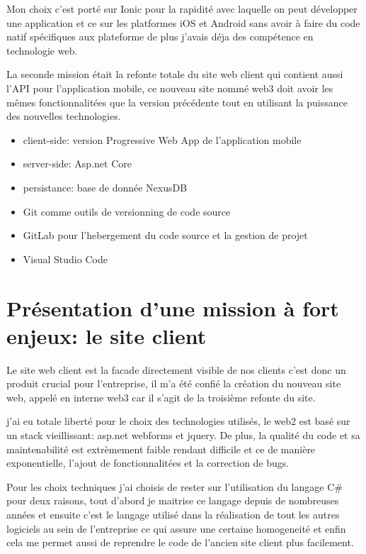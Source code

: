 Mon choix c'est porté sur Ionic pour la rapidité avec laquelle on peut développer une application 
et ce sur les platformes iOS et Android sans avoir à faire du code natif spécifiques 
aux plateforme de plus j'avais déja des compétence en technologie web.

La seconde mission était la refonte totale du site web client qui contient aussi l'API pour 
l'application mobile, ce nouveau site nommé web3 doit avoir les mêmes fonctionnalitées que 
la version précédente tout en utilisant la puissance des nouvelles technologies. \newline

\begin{itemize}
    \item client-side: version Progressive Web App de l'application mobile 
    \item server-side: Asp.net Core 
    \item persistance: base de donnée NexusDB
    \item Git comme outils de versionning de code source 
    \item GitLab pour l'hebergement du code source et la gestion de projet 
    \item Visual Studio Code \newline
\end{itemize}



\section{Présentation d'une mission à fort enjeux: le site client}
Le site web client est la facade directement visible de nos clients c'est donc un produit crucial pour
l'entreprise, il m'a été confié la création du nouveau site web, appelé en interne web3 car il s'agit de la troisième
refonte du site.

j'ai eu totale liberté pour le choix des technologies utilisés, le web2 est basé sur un stack vieillissant: asp.net webforms et jquery.
De plus, la qualité du code et sa maintenabilité est extrèmement faible rendant difficile et ce de manière 
exponentielle, l'ajout de fonctionnalitées et la correction de bugs. 

Pour les choix techniques j'ai choisis de rester sur l'utilisation du langage C\# pour deux raisons, tout d'abord 
je maitrise ce langage depuis de nombreuses années et ensuite c'est le langage utilisé dans la réalisation de tout les 
autres logiciels au sein de l'entreprise ce qui assure une certaine homogeneité et enfin cela me permet 
aussi de reprendre le code de l'ancien site client plus facilement. \newline

